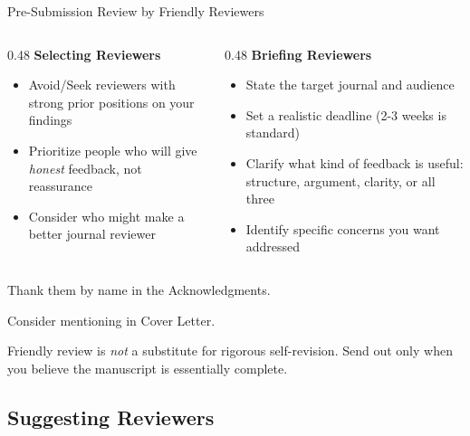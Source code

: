 \documentclass{beamer}
\begin{document}
\begin{frame}{Pre-Submission Review by Friendly Reviewers}
  \footnotesize
  \medskip
  \begin{columns}[T]
    \begin{column}{0.48\textwidth}
      \textbf{Selecting Reviewers}
      \begin{itemize}
        \item Avoid/Seek reviewers with strong prior positions on your findings
        \item Prioritize people who will give
          \emph{honest} feedback, not reassurance
        \item Consider who might make a better journal reviewer
      \end{itemize}
    \end{column}
    \begin{column}{0.48\textwidth}
      \textbf{Briefing Reviewers}
      \begin{itemize}
        \item State the target journal and audience
        \item Set a realistic deadline
          (2-3 weeks is standard)
        \item Clarify what kind of feedback is useful:
          structure, argument, clarity, or all three
        \item Identify specific concerns you want addressed
      \end{itemize}
    \end{column}
  \end{columns}

  \medskip
  Thank them by name in the Acknowledgments.

  Consider mentioning in Cover Letter.

  Friendly review is \emph{not} a substitute
  for rigorous self-revision. Send out only
  when you believe the manuscript is essentially complete.

\end{frame}

% 
\subsection{Suggesting Reviewers}
\end{document}
